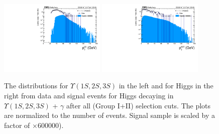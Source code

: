 \begin{figure}[!htbp]
\begin{center}
\includegraphics[width=0.45\textwidth]{figures_and_tables/outputPlots/HtoUpsilon_Cat0_ZZZZZ/nEvts/data_x_mc/withKinCuts/h_withKin_Upsilon_Pt}\hspace*{1.cm}
\includegraphics[width=0.45\textwidth]{figures_and_tables/outputPlots/HtoUpsilon_Cat0_ZZZZZ/nEvts/data_x_mc/withKinCuts/h_withKin_Z_Pt}
\end{center}\vspace*{-.5cm}
\caption{The \PT distributions for $\Upsilon(1S,2S,3S)$ in the left and for Higgs in the right from data and signal events for Higgs decaying in $\Upsilon(1S,2S,3S)$ + $\gamma$ after all (Group I+II) selection cuts. The plots are normalized to the number of events. Signal sample is scaled by a factor of $\times 600000$).}
\label{fig:pTUpsilon_and_Higgs_HtoUpsilon_Cat0_groupI_plus_II}
\end{figure}


